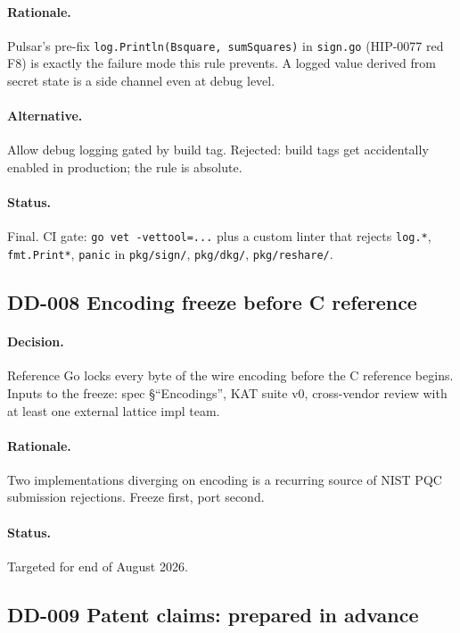 \paragraph{Rationale.}
Pulsar's pre-fix \texttt{log.Println(Bsquare, sumSquares)} in
\texttt{sign.go} (HIP-0077 red F8) is exactly the failure mode this
rule prevents. A logged value derived from secret state is a side
channel even at debug level.

\paragraph{Alternative.}
Allow debug logging gated by build tag. Rejected: build tags get
accidentally enabled in production; the rule is absolute.

\paragraph{Status.}
Final. CI gate: \texttt{go vet -vettool=...} plus a custom linter
that rejects \texttt{log.*}, \texttt{fmt.Print*}, \texttt{panic} in
\texttt{pkg/sign/}, \texttt{pkg/dkg/}, \texttt{pkg/reshare/}.

\subsection{DD-008 Encoding freeze before C reference}

\paragraph{Decision.}
Reference Go locks every byte of the wire encoding before the C
reference begins. Inputs to the freeze: spec \S``Encodings'', KAT
suite v0, cross-vendor review with at least one external lattice
impl team.

\paragraph{Rationale.}
Two implementations diverging on encoding is a recurring source of
NIST PQC submission rejections. Freeze first, port second.

\paragraph{Status.}
Targeted for end of August 2026.

\subsection{DD-009 Patent claims: prepared in advance}

